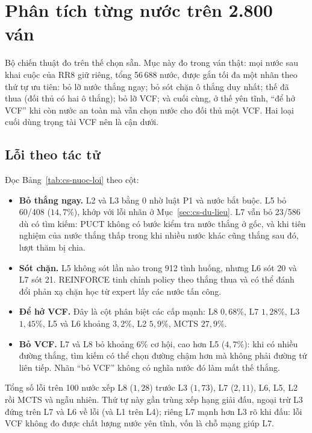 \section{Phân tích từng nước trên 2.800 ván}
\label{sec:cs-tung-nuoc}
Bộ chiến thuật đo trên thế chọn sẵn. Mục này đo trong ván thật: mọi nước sau khai cuộc của RR8 giữ riêng, tổng 56\,688
nước, được gắn tối đa một nhãn theo thứ tự ưu tiên: bỏ lỡ nước thắng ngay; bỏ sót chặn ô thắng duy nhất; thế đã thua
(đối thủ có hai ô thắng); bỏ lỡ VCF; và cuối cùng, ở thế yên tĩnh, ``để hở VCF'' khi còn nước an toàn mà vẫn chọn
nước cho đối thủ một VCF. Hai loại cuối dùng trọng tài VCF nên là cận dưới.

\subsection{Lỗi theo tác tử}

Đọc Bảng~\ref{tab:cs-nuoc-loi} theo cột:
\begin{itemize}
  \item \textbf{Bỏ thắng ngay.} L2 và L3 bằng 0 nhờ luật P1 và nước bắt buộc. L5 bỏ 60/408 ($14{,}7\%$), khớp với lỗi
  nhãn ở Mục~\ref{sec:cs-du-lieu}. L7 vẫn bỏ 23/586 dù có tìm kiếm: PUCT không có bước kiểm tra nước thắng ở gốc, và
  khi tiên nghiệm của nước thắng thấp trong khi nhiều nước khác cũng thắng sau đó, lượt thăm bị chia.
  \item \textbf{Sót chặn.} L5 không sót lần nào trong 912 tình huống, nhưng L6 sót 20 và L7 sót 21. REINFORCE tinh
  chỉnh policy theo thắng thua và có thể đánh đổi phản xạ chặn học từ expert lấy các nước tấn công.
  \item \textbf{Để hở VCF.} Đây là cột phân biệt các cấp mạnh: L8 $0{,}68\%$, L7 $1{,}28\%$, L3 $1{,}45\%$, L5 và L6 khoảng
  $3{,}2\%$, L2 $5{,}9\%$, MCTS $27{,}9\%$.
  \item \textbf{Bỏ VCF.} L7 và L8 bỏ khoảng $6\%$ cơ hội, cao hơn L5 ($4{,}7\%$): khi có nhiều đường thắng, tìm kiếm có thể
  chọn đường chậm hơn mà không phải đường tứ liên tiếp. Nhãn ``bỏ VCF'' không có nghĩa nước đó làm mất thế thắng.
\end{itemize}
Tổng số lỗi trên 100 nước xếp L8 ($1{,}28$) trước L3 ($1{,}73$), L7 ($2{,}11$), L6, L5, L2 rồi MCTS và ngẫu nhiên. Thứ tự
này gần trùng xếp hạng giải đấu, ngoại trừ L3 đứng trên L7 và L6 về lỗi (và L1 trên L4); riêng L7 mạnh hơn L3 rõ khi đấu: lỗi VCF không đo
được chất lượng nước yên tĩnh, vốn là chỗ mạng giúp L7.

